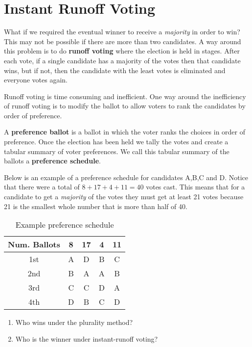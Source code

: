 \newpage

\section{Instant Runoff Voting}%
\label{sec:irv}

What if we required the eventual winner to receive a \emph{majority}
in order to win? This may not be possible if there are more than two
candidates. A way around this problem is to do \textbf{runoff voting}
where the election is held in stages. After each vote, if a single
candidate has a majority of the votes then that candidate wins, but if
not, then the candidate with the least votes is eliminated and
everyone votes again.

Runoff voting is time consuming and inefficient. One way around the
inefficiency of runoff voting is to modify the ballot to allow voters
to rank the candidates by order of preference.

\begin{definition}\label{def:preference-ballot-schedule}
  A \textbf{preference ballot} is a ballot in which the voter ranks
  the choices in order of preference. Once the election has been held
  we tally the votes and create a tabular summary of voter
  preferences. We call this tabular summary of the ballots a
  \textbf{preference schedule}.
\end{definition}

\begin{exercise}
  Below is an example of a preference schedule for candidates A,B,C
  and D. Notice that there were a total of \( 8+17+4+11=40 \) votes
  cast. This means that for a candidate to get a \emph{majority} of
  the votes they must get at least 21 votes because 21 is the smallest
  whole number that is more than half of 40.
  \begin{table}[h]
    \centering
    \begin{tabular}{ccccc}
      \toprule
      Num. Ballots & 8 & 17 & 4 & 11 \\
      \midrule
      1st & A & D & B & C \\
      2nd & B & A & A & B \\
      3rd & C & C & D & A \\
      4th & D & B & C & D \\
      \bottomrule
    \end{tabular}
    \caption{Example preference schedule}%
    \label{tab:example-preference-schedule}
  \end{table}

  \begin{enumerate}
  \item Who wins under the plurality method?


  \item Who is the winner under instant-runoff voting?


  \end{enumerate}
\end{exercise}

